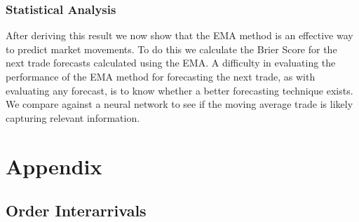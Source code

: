 \documentclass[a4paper,10pt]{article}
\begin{document}
\subsubsection{Statistical Analysis}
After deriving this result we now show that the EMA method is an effective way to predict market movements. To do this we calculate the Brier Score for the next trade forecasts calculated using the EMA. A difficulty in evaluating the performance of the EMA method for forecasting the next trade, as with evaluating any forecast, is to know whether a better forecasting technique exists. We compare against a neural network to see if the moving average trade is likely capturing relevant information.
\section{Appendix}
\subsection{Order Interarrivals}
\medskip
\printbibliography
\end{document}
